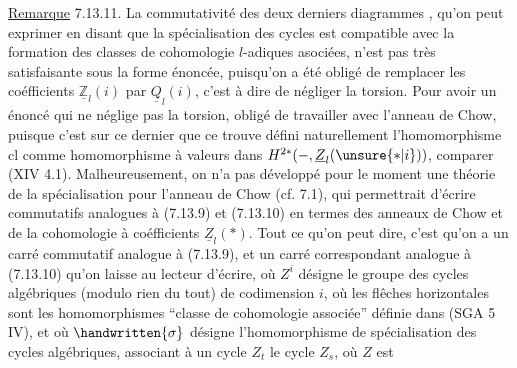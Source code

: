 
 \uline{Remarque} 7.13.11. La commutativité des deux derniers diagrammes , qu'on peut exprimer en disant que la spécialisation des cycles  est compatible avec la formation des classes de cohomologie $l$-adiques asociées, n'est pas très satisfaisante sous la forme énoncée, puisqu'on  a été obligé de remplacer les coéfficients $\underline{\mathbb Z}_{l}(i)$ par $\underline{Q}_{l}(i)$, c'est à dire de négliger la torsion. Pour avoir un énoncé qui ne néglige pas la torsion,  obligé de travailler avec l'anneau de Chow, puisque c'est sur ce dernier que ce trouve défini naturellement l'homomorphisme $\mathrm{cl}$ comme homomorphisme à valeurs dans $H^{2*}(-,\underline{Z}_{l}(\unsure{*|i}))$,  comparer (XIV 4.1). Malheureusement, on n'a pas développé pour le moment une théorie de la spécialisation pour l'anneau de Chow\deleted{\unsure{,}} (cf. 7.1), qui permettrait d'écrire  commutatifs analogues à (7.13.9) et (7.13.10) en termes des anneaux de Chow et de la cohomologie à coéfficients $\underline{Z}_{l}(*)$. Tout ce qu'on peut dire, c'est qu'on a un carré commutatif
 analogue à (7.13.9), et un carré correspondant analogue à (7.13.10) qu'on laisse au lecteur  d'écrire, où $Z^i$ désigne le groupe des cycles algébriques (modulo rien du tout) de codimension $i$,  où les flêches horizontales sont les homomorphismes ``classe de cohomologie associée'' définie dans (SGA 5 IV), et où $\handwritten{\sigma}$ désigne l'homomorphisme de spécialisation des cycles algébriques, associant à un cycle $Z_t$ le cycle $Z_s$, où $Z$ est
